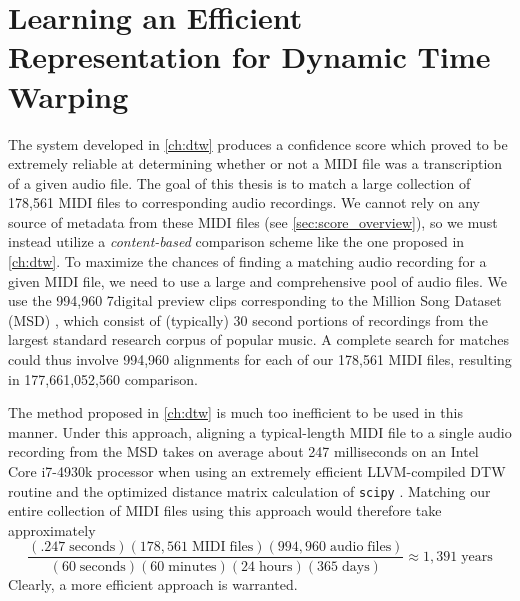 \chapter{Learning an Efficient Representation for Dynamic Time Warping}
\label{ch:dhs}

The system developed in \cref{ch:dtw} produces a confidence score which proved to be extremely reliable at determining whether or not a MIDI file was a transcription of a given audio file.
The goal of this thesis is to match a large collection of 178,561 MIDI files to corresponding audio recordings.
We cannot rely on any source of metadata from these MIDI files (see \cref{sec:score_overview}), so we must instead utilize a {\em content-based} comparison scheme like the one proposed in \cref{ch:dtw}.
To maximize the chances of finding a matching audio recording for a given MIDI file, we need to use a large and comprehensive pool of audio files.
We use the 994,960 7digital preview clips \cite{schindler2012facilitating} corresponding to the Million Song Dataset (MSD) \cite{bertin2011million}, which consist of (typically) 30 second portions of recordings from the largest standard research corpus of popular music.
A complete search for matches could thus involve 994,960 alignments for each of our 178,561 MIDI files, resulting in 177,661,052,560 comparison.

The method proposed in \cref{ch:dtw} is much too inefficient to be used in this manner.
Under this approach, aligning a typical-length MIDI file to a single audio recording from the MSD takes on average about 247 milliseconds on an Intel Core i7-4930k processor when using an extremely efficient LLVM-compiled DTW routine and the optimized distance matrix calculation of \texttt{scipy} \cite{jones2014scipy}.
Matching our entire collection of MIDI files using this approach would therefore take approximately
\begin{equation}
        \frac{(.247 \mathrm{\;seconds})(178{,}561 \mathrm{\;MIDI\;files})(994{,}960 \mathrm{\;audio\;files})}{(60 \mathrm{\;seconds})(60 \mathrm{\;minutes})(24 \mathrm{\;hours})(365 \mathrm{\;days})} \approx 1{,}391 \mathrm{\;years}
\end{equation}
Clearly, a more efficient approach is warranted.

